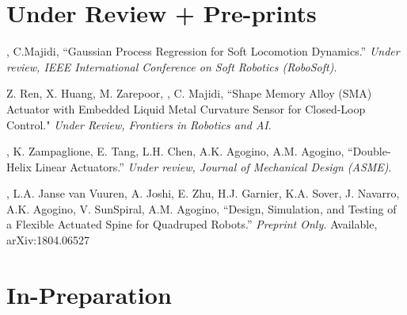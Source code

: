 \documentclass[letterpaper]{deedy-resume} %
\begin{document}
{%




\section{Under Review + Pre-prints}

\vspace{0.2cm}

\begin{etaremune}[itemsep=0.1cm]

\item \underline{{}}, C.Majidi, ``Gaussian Process Regression for Soft Locomotion Dynamics.'' {\it Under review, IEEE International Conference on Soft Robotics (RoboSoft)}.

\item Z. Ren, X. Huang, M. Zarepoor, \underline{{}}, C. Majidi, ``Shape Memory Alloy (SMA) Actuator with Embedded Liquid Metal Curvature Sensor for Closed-Loop Control." {\it Under Review, Frontiers in Robotics and AI}.

\item \underline{{}}, K. Zampaglione, E. Tang, L.H. Chen, A.K. Agogino, A.M. Agogino, ``Double-Helix Linear Actuators.'' {\it Under review, Journal of Mechanical Design (ASME)}.

\item \underline{{}}, L.A. Janse van Vuuren, A. Joshi, E. Zhu, H.J. Garnier, K.A. Sover, J. Navarro, A.K. Agogino, V. SunSpiral, A.M. Agogino, ``Design, Simulation, and Testing of a Flexible Actuated Spine for Quadruped Robots.'' {\it Preprint Only.} Available, arXiv:1804.06527 

\end{etaremune}  

  
\section{In-Preparation}

\vspace{0.1cm}

}
\end{document}
